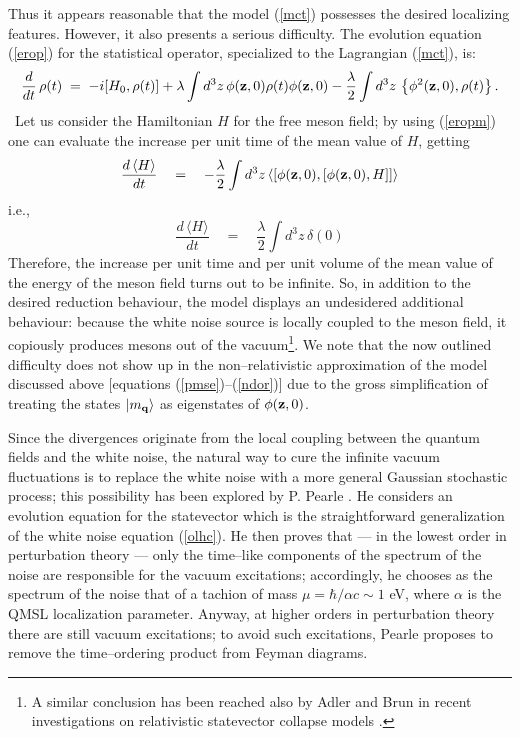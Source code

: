 \documentclass[12pt]{article}
\begin{document}
Thus it appears reasonable that the model (\ref{mct}) possesses
the desired localizing features. However, it also presents a
serious difficulty. The evolution equation (\ref{erop}) for the
statistical operator, specialized to the Lagrangian (\ref{mct}),
is:
\begin{equation} \label{eropm}
\frac{d}{dt}\,\rho(t) \; = \; -i [H_{0}, \rho(t)] + \lambda \int
d^{3}z\, \phi({\bf z}, 0) \rho(t) \phi({\bf z}, 0) -
\frac{\lambda}{2} \int d^{3}z\, \left\{ \phi^{2}({\bf z}, 0),
\rho(t) \right\}.
\end{equation}\
Let us consider the Hamiltonian $H$ for the free meson field; by
using (\ref{eropm}) one can evaluate the increase per unit time of
the mean value of $H$, getting
\begin{equation}
\frac{d\, \langle H \rangle}{dt} \quad = \quad - \frac{\lambda}{2}
\int d^{3}z\, \langle [ \phi({\bf z}, 0), [\phi({\bf z}, 0), H]]
\rangle
\end{equation}
i.e.,
\begin{equation}
\frac{d\, \langle H \rangle}{dt} \quad = \quad \frac{\lambda}{2}
\int d^{3}z\, \delta(0)
\end{equation}
Therefore, the increase per unit time and per unit volume of the
mean value of the energy of the meson field turns out to be
infinite. So, in addition to the desired reduction behaviour, the
model displays an undesidered additional behaviour: because the
white noise source is locally coupled to the meson field, it
copiously produces mesons out of the vacuum\footnote{A similar
conclusion has been reached also by Adler and Brun in recent
investigations on relativistic statevector collapse models
\cite{ad3}.}. We note that the now outlined difficulty does not
show up in the non--relativistic approximation of the model
discussed above [equations (\ref{pmse})--(\ref{ndor})] due to the
gross simplification of treating the states $|m_{\bf q}\rangle$ as
eigenstates of $\phi({\bf z}, 0)$.

Since the divergences originate from the local coupling between the
quantum fields and the white noise, the natural way to cure the
infinite vacuum fluctuations is to replace the white noise with a
more general Gaussian stochastic process; this possibility has
been explored by P. Pearle \cite{ppo1, ppo2}. He considers an
evolution equation for the statevector which is the
straightforward generalization of the white noise equation
(\ref{olhc}). He then proves that --- in the lowest order in
perturbation theory --- only the time--like components of the
spectrum of the noise are responsible for the vacuum excitations;
accordingly, he chooses as the spectrum of the noise that of a
tachion  of mass $\mu = \hbar/\alpha c \sim 1$ eV, where $\alpha$
is the QMSL localization parameter. Anyway, at higher orders in
perturbation theory there are still vacuum excitations; to avoid
such excitations, Pearle proposes to remove the time--ordering
product from Feyman diagrams.
\end{document}
